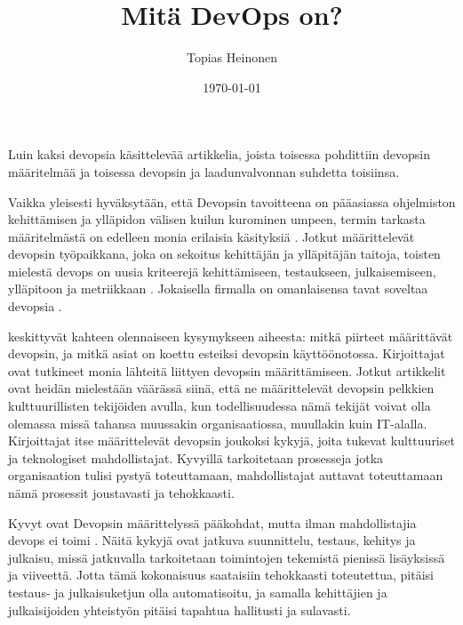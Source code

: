 \documentclass[finnish]{tktltiki2}
\title{Mitä DevOps on?}
\author{Topias Heinonen}
\date{\today}
\theoremstyle{definition}
\theoremstyle{remark}
\begin{document}

\frontmatter      %

\maketitle        %



\mainmatter       %

Luin kaksi devopsia käsittelevää artikkelia, joista toisessa pohdittiin devopsin määritelmää ja toisessa devopsin ja laadunvalvonnan suhdetta toisiinsa.

Vaikka yleisesti hyväksytään, että Devopsin tavoitteena on pääasiassa ohjelmiston kehittämisen ja ylläpidon välisen kuilun kurominen umpeen, termin tarkasta määritelmästä on edelleen monia erilaisia käsityksiä \parencite{smeds15}. Jotkut määrittelevät devopsin työpaikkana, joka on sekoitus kehittäjän ja ylläpitäjän taitoja, toisten mielestä devops on uusia kriteerejä kehittämiseen, testaukseen, julkaisemiseen, ylläpitoon ja metriikkaan \parencite{roche13}. Jokaisella firmalla on omanlaisensa tavat soveltaa devopsia \parencite{smeds15}.

\textcite{smeds15} keskittyvät kahteen olennaiseen kysymykseen aiheesta: mitkä piirteet määrittävät devopsin, ja mitkä asiat on koettu esteiksi devopsin käyttöönotossa. Kirjoittajat ovat tutkineet monia lähteitä liittyen devopsin määrittämiseen. Jotkut artikkelit ovat heidän mielestään väärässä siinä, että ne määrittelevät devopsin pelkkien kulttuurillisten tekijöiden avulla, kun todellisuudessa nämä tekijät voivat olla olemassa missä tahansa muussakin organisaatiossa, muullakin kuin IT-alalla. Kirjoittajat itse määrittelevät devopsin joukoksi kykyjä, joita tukevat kulttuuriset ja teknologiset mahdollistajat. Kyvyillä tarkoitetaan prosesseja jotka organisaation tulisi pystyä toteuttamaan, mahdollistajat auttavat toteuttamaan nämä prosessit joustavasti ja tehokkaasti.

Kyvyt ovat Devopsin määrittelyssä pääkohdat, mutta ilman mahdollistajia devops ei toimi \parencite{smeds15}. Näitä kykyjä ovat jatkuva suunnittelu, testaus, kehitys ja julkaisu, missä jatkuvalla tarkoitetaan toimintojen tekemistä pienissä lisäyksissä ja viiveettä. Jotta tämä kokonaisuus saataisiin tehokkaasti toteutettua, pitäisi testaus- ja julkaisuketjun olla automatisoitu, ja samalla kehittäjien ja julkaisijoiden yhteistyön pitäisi tapahtua hallitusti ja sulavasti.
\end{document}
